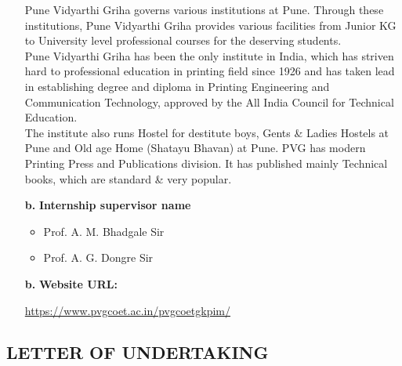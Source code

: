 \documentclass[12pt]{article}
\begin{document}
\begin{itemize}
\smallskip
\hspace{1cm}Pune Vidyarthi Griha governs various institutions at Pune. Through these institutions, Pune Vidyarthi Griha provides various facilities from Junior KG to University level professional courses for the deserving students.\\
\smallskip
\hspace{1cm}Pune Vidyarthi Griha has been the only institute in India, which has striven hard to professional education in printing field since 1926 and has taken lead in establishing degree and diploma in Printing Engineering and Communication Technology, approved by the All India Council for Technical Education.\\
\smallskip
\hspace{1cm}The institute also runs Hostel for destitute boys, Gents \& Ladies Hostels at Pune and Old age Home (Shatayu Bhavan) at Pune. PVG has modern Printing Press and Publications division. It has published mainly Technical books, which are standard \& very popular.\\
    \item[\textbf{b.}] \textbf{Internship supervisor name}\\
    \begin{itemize}
         \item Prof. A. M. Bhadgale Sir
         \item Prof. A. G. Dongre Sir
    \end{itemize}
       

\smallskip

  \item[\textbf{b.}] \textbf{Website URL:}\\
  \smallskip


\url{https://www.pvgcoet.ac.in/pvgcoetgkpim/}
\end{itemize}
\pagebreak
\begin{center}
\section*{LETTER OF UNDERTAKING}
\end{center}
\bigskip
\end{document}
